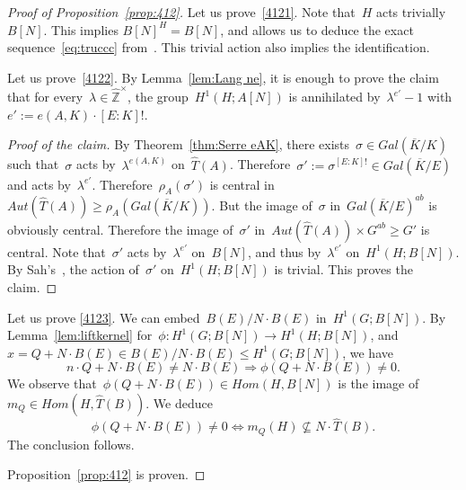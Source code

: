 \documentclass[12pt]{amsart}
\newcommand{\Z}{{\mathbb Z}}
\newcommand{\ol}{\overline}
\newcommand{\wh}{\widehat}
\begin{document}
\begin{proof}[Proof of Proposition~\ref{prop:412}]Let us prove~\eqref{4121}. Note that~$H$ acts trivially~$B[N]$. This implies $B[N]^H=B[N]$, and allows us to deduce the exact sequence~\eqref{eq:truccc} from~\cite[Ch.\,I, \S2.6 b)]{LNM5}. This trivial action also implies the identification.

Let us prove~\eqref{4122}.
By Lemma~\ref{lem:Lang ne}, it is enough to prove the claim that for every~$\lambda \in\wh{\Z}^\times$, the group~$H^1(H;A[N])$ is annihilated by~$\lambda^{e'}-1$ with~$e':=e(A,K)\cdot [E:K]!$.
\begin{proof}[Proof of the claim]By Theorem~\ref{thm:Serre eAK}, there exists~$\sigma\in Gal(\ol{K}/K)$ such that~$\sigma$ acts by~$\lambda^{e(A,K)}$ on~$\wh{T}(A)$. Therefore~$\sigma':=\sigma^{[E:K]!}\in Gal(\ol{K}/E)$ and acts by~$\lambda^{e'}$.  Therefore~$\rho_A(\sigma')$ is central in~$Aut(\wh{T}(A))\geq \rho_A(Gal(\ol{K}/K))$. But the image of~$\sigma$ in~$Gal(\ol{K}/E)^{ab}$ is obviously central. Therefore the image of~$\sigma'$ in~$Aut(\wh{T}(A))\times G^{ab}\geq G'$ is central. Note that~$\sigma'$ acts by~$\lambda^{e'}$ on~$B[N]$, and thus by~$\lambda^{e'}$ on~$H^1(H;B[N])$. By Sah's~\cite[App. 2, Lem.~D]{Hindry}, the action of~$\sigma'$ on~$H^1(H;B[N])$ is trivial. This proves the claim.
\end{proof}

Let us prove \eqref{4123}. We can embed~$B(E)/N\cdot B(E)$ in~$H^1(G;B[N])$. By Lemma~\ref{lem:liftkernel} for~$\phi:H^1(G;B[N])\to H^1(H;B[N])$, and~$x=Q+N\cdot B(E)\in B(E)/N\cdot B(E)\leq H^1(G;B[N])$, we have
\[
n\cdot Q+N\cdot B(E)\neq N\cdot B(E)\Rightarrow \phi(Q+N\cdot B(E))\neq 0.
\]
We observe that~$\phi(Q+N\cdot B(E))\in Hom(H,B[N])$ is the image of~$m_Q \in Hom(H,\wh{T}(B))$. We deduce
\[
\phi(Q+N\cdot B(E))\neq 0\Leftrightarrow m_Q(H)\not\subseteq N\cdot \wh{T}(B).
\]
The conclusion follows.

Proposition~\ref{prop:412} is proven.
\end{proof}
\end{document}

